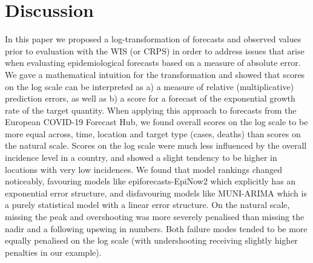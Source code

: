 \documentclass{article}
\begin{document}
\section{Discussion}
\label{sec:discussion}

In this paper we proposed a log-transformation of forecasts and observed values prior to evaluation with the WIS (or CRPS) in order to address issues that arise when evaluating epidemiological forecasts based on a measure of absolute error. We gave a mathematical intuition for the transformation and showed that scores on the log scale can be interpreted as a) a measure of relative (multiplicative) prediction errors, as well as b) a score for a forecast of the exponential growth rate of the target quantity. 
When applying this approach to forecasts from the European COVID-19 Forecast Hub, we found overall scores on the log scale to be more equal across, time, location and target type (cases, deaths) than scores on the natural scale. Scores on the log scale were much less influenced by the overall incidence level in a country, and showed a slight tendency to be higher in locations with very low incidences. We found that model rankings changed noticeably, favouring models like epiforecasts-EpiNow2 which explicitly has an exponential error structure, and disfavouring models like MUNI-ARIMA which is a purely statistical model with a linear error structure. On the natural scale, missing the peak and overshooting was more severely penalised than missing the nadir and a following upswing in numbers. Both failure modes tended to be more equally penalised on the log scale (with undershooting receiving slightly higher penalties in our example). 
\end{document}
